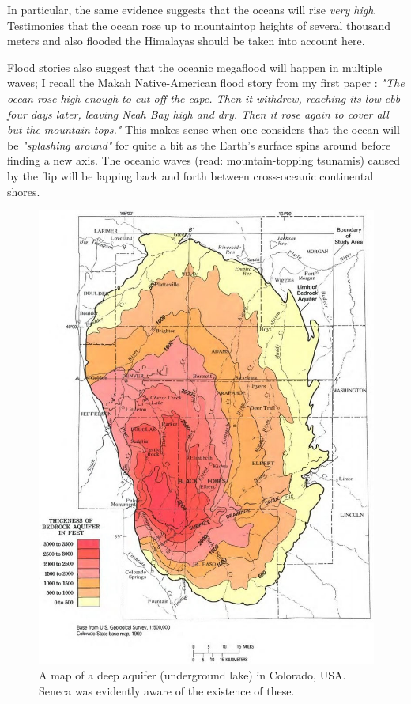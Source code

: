 \documentclass[10pt,twocolumn,letterpaper]{article}
\begin{document}
In particular, the same evidence suggests that the oceans will rise \textit{very high}. Testimonies that the ocean rose up to mountaintop heights of several thousand meters and also flooded the Himalayas should be taken into account here.

Flood stories also suggest that the oceanic megaflood will happen in multiple waves; I recall the Makah Native-American flood story from my first paper \cite{3}: \textit{"The ocean rose high enough to cut off the cape. Then it withdrew, reaching its low ebb four days later, leaving Neah Bay high and dry. Then it rose again to cover all but the mountain tops."} This makes sense when one considers that the ocean will be \textit{"splashing around"} for quite a bit as the Earth's surface spins around before finding a new axis. The oceanic waves (read: mountain-topping tsunamis) caused by the flip will be lapping back and forth between cross-oceanic continental shores.

\begin{figure}[t]
\begin{center}
   \includegraphics[width=1\linewidth]{aquifer.jpg}
\end{center}
   \caption{A map of a deep aquifer (underground lake) in Colorado, USA. Seneca was evidently aware of the existence of these.}
\label{fig:2}
\label{fig:onecol}
\end{figure}
\end{document}
